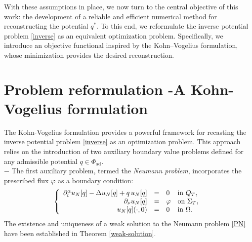 \documentclass[a4paper,12pt,reqno,natbib]{amsart}
\begin{document}
With these assumptions in place, we now turn to the central objective of this work: the development of a reliable and efficient numerical method for reconstructing the potential $q^*$. To this end, we reformulate the inverse potential problem \eqref{inverse} as an equivalent optimization problem. Specifically, we introduce an objective functional inspired by the Kohn–Vogelius formulation, whose minimization provides the desired reconstruction.



\section{Problem reformulation -A Kohn-Vogelius formulation}\label{sec:4}

The Kohn-Vogelius formulation provides a powerful framework for recasting the inverse potential problem \eqref{inverse} as an optimization problem. This approach relies on the introduction of two auxiliary boundary value problems defined for any admissible potential $q \in \Phi_{\text{ad}}$.\,\\

\noindent $-$ The first auxiliary problem, termed the \emph{Neumann problem}, incorporates the prescribed flux $\varphi$ as a boundary condition:
\begin{eqnarray} \label{PN}
\left\{
  \begin{array}{rcll}
    \partial_{t} ^{\alpha}  u_N[q]-\Delta  u_N[q] +q\, u_N[q]&=&0&\hbox{in}\ Q_T, \\
    \displaystyle \partial_\nu u_N[q]&=&\varphi &\hbox{on}\  \Sigma_T, \\
   u_N[q](\cdot,0)&=&0  &\hbox{in}\ \Omega.
  \end{array}
\right.
\end{eqnarray}
The existence and uniqueness of a weak solution to the Neumann problem \eqref{PN} have been established in Theorem \ref{weak-solution}.\,\\
\end{document}
